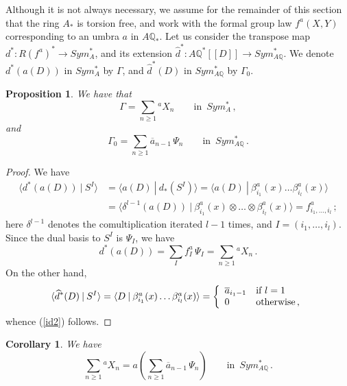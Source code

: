 \documentclass[a4paper,12pt]{amsart}
\newtheorem{prop}[equation]{Proposition}
\newtheorem{cor}[equation]{Corollary}
\theoremstyle{definition}
\numberwithin{equation}{section}
\newcommand{\bQ}{{\mathbb Q}}
\newcommand{\ba}[1]{\mbox{$\beta_{#1}^{a}(x)$}}
\newcommand{\fa}[1]{\mbox{$f_{#1}^{a}$}}
\newcommand{\br}[1]{\langle#1\rangle}
\newcommand{\dual}[2]{\br{#1 \:|\: #2}}
\newcommand{\spa}{\;\:}
\newcommand{\sla}{Sym_A^* }
\newcommand{\slah}{Sym_{A\bQ}^* }
\newcommand{\casec}[5]{#1#2 \left\{ \begin{array}{ll} #3 &\mbox{if $#4$} \\ #5 &\mbox{otherwise\,,} \end{array} \right.}
\begin{document}
Although it is not always necessary, we assume for the remainder of this section that the ring $A_*$ is torsion free, and work with the formal group law $f^a(X,Y)$ corresponding to an umbra $a$ in $A\bQ_*$. Let us consider the transpose map $d^*\colon R(f^a)^*\rightarrow\sla$, and its
extension $\widehat{d}^*\colon A\bQ^*[[D]]\rightarrow\slah$. We denote $d^*(a(D))$ in $\sla$ by $\varGamma$, and $\widehat{d}^*(D)$ in $\slah$ by $\varGamma_0$. 
\begin{prop}\label{duald}
We have that
\begin{equation}\label{id1}
\varGamma=\sum_{n\ge 1}\!^a X_n\qquad\mbox{in}\spa\sla\,,
\end{equation}
and
\begin{equation}\label{id2}
\varGamma_0=\sum_{n\ge
1}\overline{a}_{n-1}\,\varPsi_n\qquad\mbox{in}\spa\slah\,.
\end{equation}
\end{prop}
\begin{proof}
We have
\begin{align*}
\dual{d^*(a(D))}{S^I}&=\dual{a(D)}{d_*(S^I)}=\dual{a(D)}{\ba{i_1}\ldots\ba{i_l}}\\
&=\dual{\delta^{l-1}(a(D))}{\ba{i_1}\otimes\ldots\otimes\ba{i_l}}=\fa{i_1,\ldots,i_l}\,;
\end{align*}
here $\delta^{l-1}$ denotes the comultiplication iterated $l-1$ times,
and $I=(i_1,\ldots,i_l)$. Since the dual basis to $S^I$ is
$\varPsi_I$, we have
\[ d^*(a(D))=\sum_I \fa{I}\,\varPsi_I=\sum_{n\ge 1}\!^a X_n\,.\]
On the other hand, 
\[\casec{\dual{\widehat{d}^*(D)}{S^I}=\dual{D}{\ba{i_1}\ldots\ba{i_l}}}{=}{\overline{a}_{i_1-1}}{l=1}{0}\]
whence (\ref{id2}) follows.
\end{proof}

\begin{cor}\label{cor1}
We have
\[ \sum_{n\ge 1}\!^a X_n=a\left(\sum_{n\ge
1}\overline{a}_{n-1}\,\varPsi_n\right)\qquad\mbox{in}\spa\slah\,.\]
\end{cor}
\end{document}
